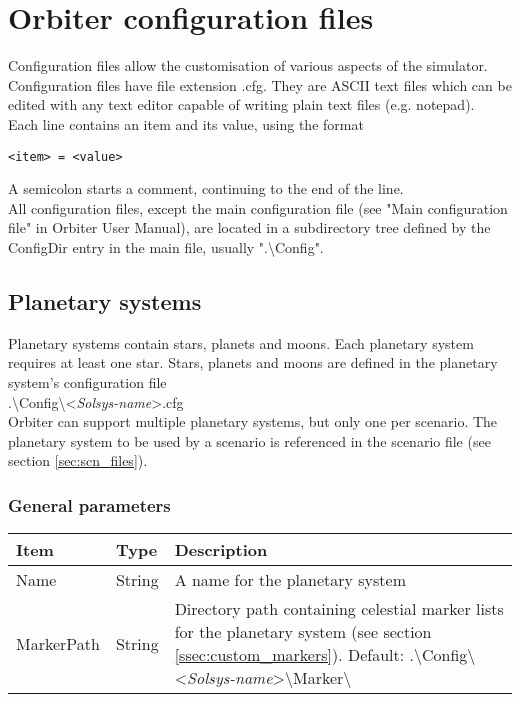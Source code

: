 \documentclass[Orbiter Developer Manual.tex]{subfiles}
\begin{document}
\section{Orbiter configuration files}
Configuration files allow the customisation of various aspects of the simulator. Configuration files have file extension .cfg. They are ASCII text files which can be edited with any text editor capable of writing plain text files (e.g. notepad).\\
Each line contains an item and its value, using the format

\begin{lstlisting}[language=OSFS]
<item> = <value>
\end{lstlisting}

\noindent
A semicolon starts a comment, continuing to the end of the line.\\
All configuration files, except the main configuration file (see "Main configuration file" in Orbiter User Manual), are located in a subdirectory tree defined by the ConfigDir entry in the main file, usually ".\textbackslash Config".

\subsection{Planetary systems}
\label{ssec:planetery_sys}
Planetary systems contain stars, planets and moons. Each planetary system requires at least one star. Stars, planets and moons are defined in the planetary system's configuration file\\
\indent .\textbackslash Config\textbackslash <\textit{Solsys-name}>.cfg\\
Orbiter can support multiple planetary systems, but only one per scenario. The planetary system to be used by a scenario is referenced in the scenario file (see section \ref{sec:scn_files}).

\subsubsection*{General parameters}

	\begin{longtable}{ |p{}|p{}|p{}| }
	\hline\rule{0pt}{2ex}
	\textbf{Item} & \textbf{Type} & \textbf{Description}\\
	\hline\rule{0pt}{2ex}
	Name & String & A name for the planetary system\\
	\hline\rule{0pt}{2ex}
	MarkerPath & String & Directory path containing celestial marker lists for the planetary system (see section \ref{ssec:custom_markers}). Default: .\textbackslash Config\textbackslash <\textit{Solsys-name}>\textbackslash Marker\textbackslash \\
	\hline
	\end{longtable}
\end{document}
